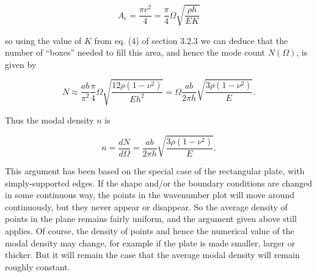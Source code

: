   \begin{equation*}A_c = \dfrac{\pi r^2}{4} = \dfrac{\pi}{4} \Omega 
  \sqrt{\dfrac{\rho h}{EK}} \tag{4}\end{equation*} 

  \noindent{}so using the value of $K$ from eq. (4) of section 3.2.3 we can 
  deduce that the number of ``boxes'' needed to fill this area, and hence the 
  mode count $N(\Omega)$, is given by 

  \begin{equation*}N \approx \dfrac{ab}{\pi^2} \dfrac{\pi}{4} \Omega 
  \sqrt{\dfrac{12 \rho (1-\nu^2)}{Eh^2}} = \Omega \dfrac{ab}{2 \pi h} 
  \sqrt{\dfrac{3 \rho (1-\nu^2)}{E}} . \tag{5}\end{equation*} 

  Thus the modal density $n$ is 

  \begin{equation*}n=\dfrac{dN}{d \Omega} = \dfrac{ab}{2 \pi h} \sqrt{\dfrac{3 
  \rho (1-\nu^2)}{E}} . \tag{6}\end{equation*} 

  This argument has been based on the special case of the rectangular plate, 
  with simply-supported edges. If the shape and/or the boundary conditions are 
  changed in some continuous way, the points in the wavenumber plot will move 
  around continuously, but they never appear or disappear. So the average 
  density of points in the plane remains fairly uniform, and the argument given 
  above still applies. Of course, the density of points and hence the numerical 
  value of the modal density may change, for example if the plate is made 
  smaller, larger or thicker. But it will remain the case that the average 
  modal density will remain roughly constant. 